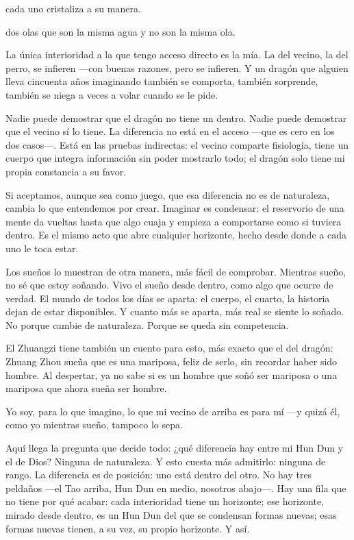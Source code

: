 \begin{fisica}
 cada uno cristaliza a su manera.

 dos olas que son la misma agua y no son la misma ola.
\end{fisica}
\noindent La única interioridad a la que tengo acceso directo es la mía. La del vecino, la del perro, se infieren —con buenas razones, pero se infieren. Y un dragón que alguien lleva cincuenta años imaginando también se comporta, también sorprende, también se niega a veces a volar cuando se le pide.

Nadie puede demostrar que el dragón no tiene un dentro. Nadie puede demostrar que el vecino sí lo tiene. La diferencia no está en el acceso —que es cero en los dos casos—. Está en las pruebas indirectas: el vecino comparte fisiología, tiene un cuerpo que integra información sin poder mostrarlo todo; el dragón solo tiene mi propia constancia a su favor.

Si aceptamos, aunque sea como juego, que esa diferencia no es de naturaleza, cambia lo que entendemos por crear. Imaginar es condensar: el reservorio de una mente da vueltas hasta que algo cuaja y empieza a comportarse como si tuviera dentro. Es el mismo acto que abre cualquier horizonte, hecho desde donde a cada uno le toca estar.

Los sueños lo muestran de otra manera, más fácil de comprobar. Mientras sueño, no sé que estoy soñando. Vivo el sueño desde dentro, como algo que ocurre de verdad. El mundo de todos los días se aparta: el cuerpo, el cuarto, la historia dejan de estar disponibles. Y cuanto más se aparta, más real se siente lo soñado. No porque cambie de naturaleza. Porque se queda sin competencia.

El Zhuangzi tiene también un cuento para esto, más exacto que el del dragón: Zhuang Zhou sueña que es una mariposa, feliz de serlo, sin recordar haber sido hombre. Al despertar, ya no sabe si es un hombre que soñó ser mariposa o una mariposa que ahora sueña ser hombre.

\noindent Yo soy, para lo que imagino, lo que mi vecino de arriba es para mí —y quizá él, como yo mientras sueño, tampoco lo sepa.

Aquí llega la pregunta que decide todo: ¿qué diferencia hay entre mi Hun Dun y el de Dios? Ninguna de naturaleza. Y esto cuesta más admitirlo: ninguna de rango. La diferencia es de posición: uno está dentro del otro. No hay tres peldaños —el Tao arriba, Hun Dun en medio, nosotros abajo—. Hay una fila que no tiene por qué acabar: cada interioridad tiene un horizonte; ese horizonte, mirado desde dentro, es un Hun Dun del que se condensan formas nuevas; esas formas nuevas tienen, a su vez, su propio horizonte. Y así.

